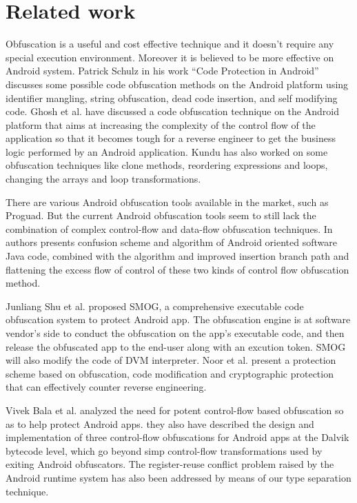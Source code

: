 \section{Related work}
Obfuscation is a useful and cost effective technique and it doesn’t require any special execution environment. Moreover it is believed to be more effective on Android system\cite{21,22}. Patrick Schulz in his work “Code Protection in Android”\cite{20} discusses some possible code obfuscation methods on the Android platform using identifier mangling, string obfuscation, dead code insertion, and self modifying code. Ghosh et al.\cite{23} have discussed a code obfuscation technique on the Android platform that aims at increasing the complexity of the control flow of the application so that it becomes tough for a reverse engineer to get the business logic performed by an Android application. Kundu has also worked on some obfuscation techniques like clone methods, reordering expressions and loops, changing the arrays and loop transformations\cite{24}.

There are various Android obfuscation tools available in the market, such as Proguad\cite{09}. But the current Android obfuscation tools seem to still lack the combination of complex control-flow and data-flow obfuscation techniques. In \cite{06,07,08} authors presents confusion scheme and algorithm of Android oriented software Java code, combined with the algorithm and improved insertion branch path and flattening the excess flow of control of these two kinds of control flow obfuscation method.

Junliang Shu et al. proposed SMOG\cite{10}, a comprehensive executable code obfuscation system to protect Android app. The obfuscation engine is at software vendor's side to conduct the obfuscation on the app's executable code, and then release the obfuscated app to the end-user along with an excution token. SMOG will also modify the code of DVM interpreter. Noor et al.\cite{26} present a protection scheme based on obfuscation, code modification and cryptographic protection that can effectively counter reverse engineering.

Vivek Bala et al.\cite{27} analyzed the need for potent control-flow based obfuscation so as to help protect Android apps. they also have described the design and implementation of three control-flow obfuscations for Android apps at the Dalvik bytecode level, which go beyond simp control-flow transformations used by exiting Android obfuscators. The register-reuse conflict problem raised by the Android runtime system has also been addressed by means of our type separation technique.
